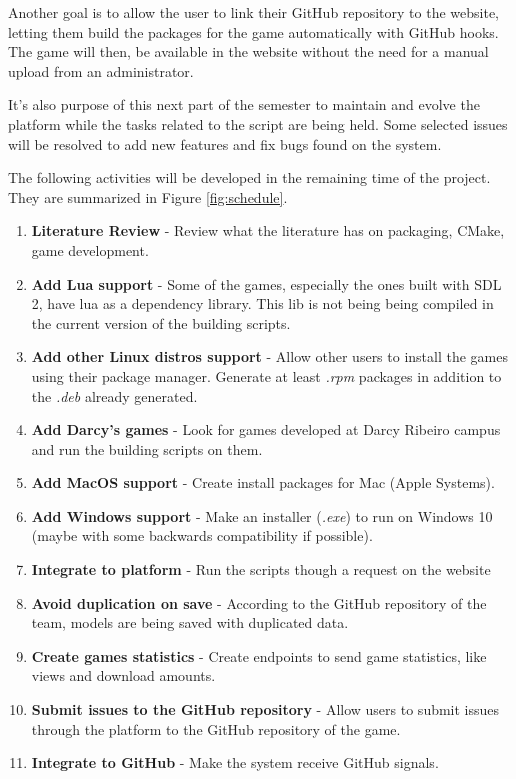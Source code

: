 Another goal is to allow the user to link their GitHub repository to the website, letting them build the packages for the game automatically with GitHub hooks. The game will then, be available in the website without the need for a manual upload from an administrator.

It's also purpose of this next part of the semester to maintain and evolve the platform while the tasks related to the script are being held. Some selected issues will be resolved to add new features and fix bugs found on the system.

The following activities will be developed in the remaining time of the project. They are summarized in Figure \ref{fig:schedule}.

\begin{enumerate}
\item \textbf{Literature Review} - Review what the literature has on packaging, CMake, game development.
\item \textbf{Add Lua support} - Some of the games, especially the ones built with SDL 2, have lua as a dependency library. This lib is not being being compiled in the current version of the building scripts.
\item \textbf{Add other Linux distros support} - Allow other users to install the games using their package manager. Generate at least \textit{.rpm} packages in addition to the \textit{.deb} already generated.
\item \textbf{Add Darcy's games} - Look for games developed at Darcy Ribeiro campus and run the building scripts on them.
\item \textbf{Add MacOS support} - Create install packages for Mac (Apple Systems).
\item \textbf{Add Windows support} - Make an installer (\textit{.exe}) to run on Windows 10 (maybe with some backwards compatibility if possible).
\item \textbf{Integrate to platform} - Run the scripts though a request on the website
\item \textbf{Avoid duplication on save} - According to the GitHub repository of the team, models are being saved with duplicated data.
\item \textbf{Create games statistics} - Create endpoints to send game statistics, like views and download amounts.
\item \textbf{Submit issues to the GitHub repository} - Allow users to submit issues through the platform to the GitHub repository of the game.
\item \textbf{Integrate to GitHub} - Make the system receive GitHub signals.

\end{enumerate}
